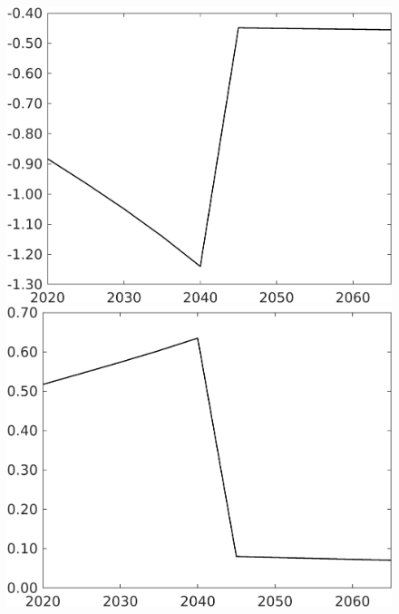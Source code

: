 \begin{figure}[h!!!]
\begin{minipage}[]{0.32\textwidth}
	\end{minipage}
	\begin{minipage}[]{0.32\textwidth}
		\includegraphics[width=1\textwidth]{../../codding_model/own_basedOnFried/optimalPol_010922_revision/figures/all_13Sept22_Tplus30/gAf_OPT_COMPtaulPer_regime4_spillover0_knspil1_noskill0_sep0_xgrowth0_PV1_etaa0.79.png}
	\end{minipage}
	\begin{minipage}[]{0.32\textwidth}
		\includegraphics[width=1\textwidth]{../../codding_model/own_basedOnFried/optimalPol_010922_revision/figures/all_13Sept22_Tplus30/gAg_OPT_COMPtaulPer_regime4_spillover0_knspil1_noskill0_sep0_xgrowth0_PV1_etaa0.79.png}

\end{minipage}
\end{figure}
